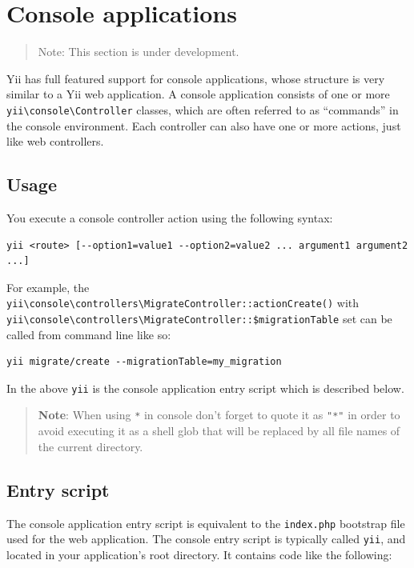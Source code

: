 \label{tutorial-console.md}\section{Console applications}
\begin{quote}Note: This section is under development.

\end{quote}
Yii has full featured support for console applications, whose structure is very similar to a Yii web application. A console application
consists of one or more \texttt{yii{\allowbreak{}\textbackslash}console{\allowbreak{}\textbackslash}Controller} classes, which are often referred to as ``commands'' in the console environment. Each controller can also have one or more actions, just like web controllers.

\subsection{Usage \label{tutorial-console.md::usage}}
You execute a console controller action using the following syntax:

\begin{lstlisting}
yii <route> [--option1=value1 --option2=value2 ... argument1 argument2 ...]
\end{lstlisting}
For example, the \texttt{yii{\allowbreak{}\textbackslash}console{\allowbreak{}\textbackslash}controllers{\allowbreak{}\textbackslash}MigrateController\allowbreak{}::\allowbreak{}actionCreate()}
with \texttt{yii{\allowbreak{}\textbackslash}console{\allowbreak{}\textbackslash}controllers{\allowbreak{}\textbackslash}MigrateController\allowbreak{}::\allowbreak{}\$migrationTable} set can
be called from command line like so:

\begin{lstlisting}
yii migrate/create --migrationTable=my_migration
\end{lstlisting}
In the above \lstinline|yii| is the console application entry script which is described below.

\begin{quote}\textbf{Note}: When using \lstinline|*| in console don't forget to quote it as \lstinline|"*"| in order to avoid executing it as a shell
glob that will be replaced by all file names of the current directory.

\end{quote}
\subsection{Entry script \label{tutorial-console.md::entry-script}}
The console application entry script is equivalent to the \lstinline|index.php| bootstrap file used for the web application.
The console entry script is typically called \lstinline|yii|, and located in your application's root directory.
It contains code like the following:


